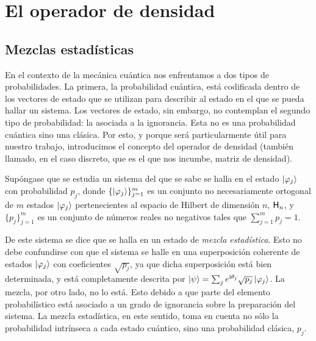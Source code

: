 \section{El operador de densidad}
\label{sec:ch2_density_operator}

\subsection{Mezclas estadísticas}


En el contexto de la mecánica cuántica nos enfrentamos a dos tipos de probabilidades. La primera, la probabilidad cuántica, está codificada dentro de los vectores de estado que se utilizan para describir al estado en el que se pueda hallar un sistema. Los vectores de estado, sin embargo, no contemplan el segundo tipo de probabilidad: la asociada a la ignorancia. Esta no es una probabilidad cuántica sino una clásica. Por esto, y porque será particularmente útil para nuestro trabajo, introducimos el concepto del operador de densidad (también llamado, en el caso discreto, que es el que nos incumbe, matriz de densidad).



Supóngase que se estudia un sistema del que se sabe se halla en el estado $\ket{\varphi_{j}}$ con probabilidad $p_{j}$, donde $\{\ket{\varphi_{j}}\}_{j=1}^{m}$ es un conjunto no necesariamente ortogonal de $m$ estados $\ket{\varphi_{j}}$ pertenecientes al espacio de Hilbert de dimensión $n$, ${\sf H}_{n}$, y $\{p_{j}\}_{j=1}^{m}$ es un conjunto de números reales no negativos tales que $\sum_{j=1}^{m} p_{j}=1$.

De este sistema se dice que se halla en un estado de \textit{mezcla estadística}. Esto no debe confundirse con que el sistema se halle en una superposición coherente de estados $\ket{\varphi_{j}}$ con coeficientes $\sqrt{p_{j}}$, ya que dicha superposición está bien determinada, y está completamente descrita por $\ket{\psi}=\sum_{j} e^{\text{i} \theta_j} \sqrt{p_{j}}\ket{\varphi_{j}}$. La mezcla, por otro lado, no lo está. Esto debido a que parte del elemento probabilístico está asociado a un grado de ignorancia sobre la preparación del sistema. La mezcla estadística, en este sentido, toma en cuenta no sólo la probabilidad intrínseca a cada estado cuántico, sino una probabilidad clásica, $p_{j}$. 

